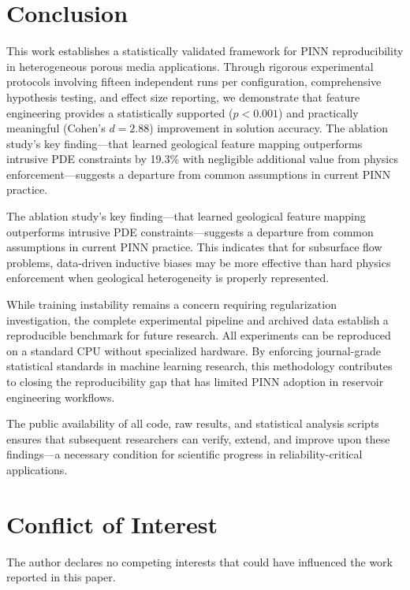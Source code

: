 \documentclass[sn-mathphys]{sn-jnl}
\begin{document}
	\section{Conclusion}
		This work establishes a statistically validated framework for PINN reproducibility in heterogeneous porous media applications. Through rigorous experimental protocols involving fifteen independent runs per configuration, comprehensive hypothesis testing, and effect size reporting, we demonstrate that feature engineering provides a statistically supported ($p<0.001$) and practically meaningful (Cohen's $d=2.88$) improvement in solution accuracy. The ablation study's key finding—that learned geological feature mapping outperforms intrusive PDE constraints by 19.3\% with negligible additional value from physics enforcement—suggests a departure from common assumptions in current PINN practice.
	
	
	
	The ablation study's key finding—that learned geological feature mapping outperforms intrusive PDE constraints—suggests a departure from common assumptions in current PINN practice. This indicates that for subsurface flow problems, data-driven inductive biases may be more effective than hard physics enforcement when geological heterogeneity is properly represented.
	
	While training instability remains a concern requiring regularization investigation, the complete experimental pipeline and archived data establish a reproducible benchmark for future research. All experiments can be reproduced on a standard CPU without specialized hardware. By enforcing journal-grade statistical standards in machine learning research, this methodology contributes to closing the reproducibility gap that has limited PINN adoption in reservoir engineering workflows.
	
	The public availability of all code, raw results, and statistical analysis scripts ensures that subsequent researchers can verify, extend, and improve upon these findings—a necessary condition for scientific progress in reliability-critical applications.
	
	\section*{Conflict of Interest}
	The author declares no competing interests that could have influenced the work reported in this paper.
	
\end{document}
